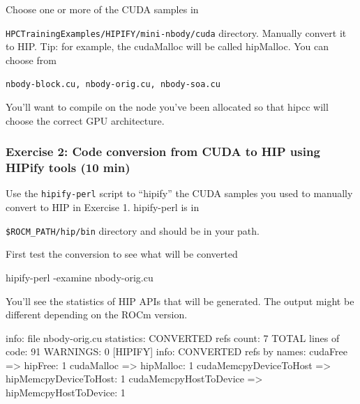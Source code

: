 \documentclass[
]{article}
\let\oldtexttt\texttt
\renewcommand{\texttt}[1]{
  \colorbox{Light}{\oldtexttt{#1}}
}
\newenvironment{Shaded}{}{}
\newcommand{\ExtensionTok}[1]{#1}
\newcommand{\NormalTok}[1]{#1}
\newcommand{\OperatorTok}[1]{\textcolor[rgb]{0.40,0.40,0.40}{#1}}
\newcommand{\StringTok}[1]{\textcolor[rgb]{0.25,0.44,0.63}{#1}}
\begin{document}
Choose one or more of the CUDA samples in
\texttt{HPCTrainingExamples/HIPIFY/mini-nbody/cuda} directory. Manually
convert it to HIP. Tip: for example, the cudaMalloc will be called
hipMalloc. You can choose from
\texttt{nbody-block.cu,\ nbody-orig.cu,\ nbody-soa.cu}

You'll want to compile on the node you've been allocated so that hipcc
will choose the correct GPU architecture.

\hypertarget{exercise-2-code-conversion-from-cuda-to-hip-using-hipify-tools-10-min}{%
\subsubsection{Exercise 2: Code conversion from CUDA to HIP using HIPify
tools (10
min)}\label{exercise-2-code-conversion-from-cuda-to-hip-using-hipify-tools-10-min}}

Use the \texttt{hipify-perl} script to ``hipify'' the CUDA samples you
used to manually convert to HIP in Exercise 1. hipify-perl is in
\texttt{\$ROCM\_PATH/hip/bin} directory and should be in your path.

First test the conversion to see what will be converted

\begin{Shaded}
\begin{Highlighting}[]
\ExtensionTok{hipify{-}perl}\NormalTok{ {-}examine nbody{-}orig.cu}
\end{Highlighting}
\end{Shaded}

You'll see the statistics of HIP APIs that will be generated. The output
might be different depending on the ROCm version.

\begin{Shaded}
\begin{Highlighting}[]
\NormalTok{[}\ExtensionTok{HIPIFY}\NormalTok{] info: file }\StringTok{\textquotesingle{}nbody{-}orig.cu\textquotesingle{}}\NormalTok{ statistics:}
  \ExtensionTok{CONVERTED}\NormalTok{ refs count: 7}
  \ExtensionTok{TOTAL}\NormalTok{ lines of code: 91}
  \ExtensionTok{WARNINGS}\NormalTok{: 0}
\NormalTok{[}\ExtensionTok{HIPIFY}\NormalTok{] info: CONVERTED refs by names:}
  \ExtensionTok{cudaFree}\NormalTok{ =}\OperatorTok{\textgreater{}}\NormalTok{ hipFree: 1}
  \ExtensionTok{cudaMalloc}\NormalTok{ =}\OperatorTok{\textgreater{}}\NormalTok{ hipMalloc: 1}
  \ExtensionTok{cudaMemcpyDeviceToHost}\NormalTok{ =}\OperatorTok{\textgreater{}}\NormalTok{ hipMemcpyDeviceToHost: 1}
  \ExtensionTok{cudaMemcpyHostToDevice}\NormalTok{ =}\OperatorTok{\textgreater{}}\NormalTok{ hipMemcpyHostToDevice: 1}
\end{Highlighting}
\end{Shaded}
\end{document}
